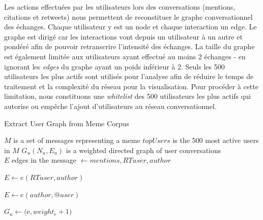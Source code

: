     Les actions effectuées par les utilisateurs lors des conversations (mentions, citations et retweets) nous permettent de reconstituer le graphe conversationnel des échanges. Chaque utilisateur y est un node et chaque interaction un edge. Le graphe est dirigé car les interactions vont depuis un utilisateur à un autre et pondéré afin de pouvoir retranscrire l'intensité des échanges. La taille du graphe est également limitée aux utilisateurs ayant effectué au moins 2 échanges - en ignorant les \textit{edges} du graphe ayant un poids inférieur à 2. Seuls les 500 utilisateurs les plus actifs sont utilisés pour l'analyse afin de réduire le temps de traitement et la complexité du réseau pour la visualisation. Pour procéder à cette limitation, nous constituons une \textit{whitelist} des 500 utilisateurs les plus actifs qui autorise ou empêche l'ajout d'utilisateurs au réseau conversationnel.

    \begin{algorithm}[h]
        \caption{Extract User Graph from Meme Corpus}
        \label{algo:meme-user-graph}
        \begin{algorithmic}
            \Require $M$ is a set of messages representing a meme
            \State $topUsers$ is the 500 most active users in $M$
            \State $G_u(N_u,E_u)$ is a weighted directed graph of user conversations
            \\
                    \State $E$ edges in the message
                    \State {}  $ \gets mentions, RTuser, author$
                    

                            \State $E \gets e(RTuser, author)$    
                        \EndIf

                            \State $E \gets e(author, @user)$    
                        \EndFor
                        
                            \State $G_u \gets ($e$,weight_e+1)$
                        \EndFor

                    \EndIf

                \EndFor
            \EndFunction
        \end{algorithmic}
    \end{algorithm}

